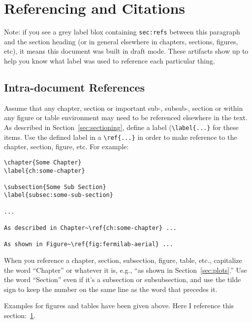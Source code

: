 \FloatBarrier
\section{Referencing and Citations}
\label{sec:refs}

Note: if you see a grey label blox containing \texttt{sec:refs}
between this paragraph and the section heading (or in general
elsewhere in chapters, sections, figures, etc), it means this document
was built in draft mode.  
These artifacts show up to help you know what label was used to
reference each particular thing.


\subsection{Intra-document References}

Assume that any chapter, section or important sub-, subsub-, section
or within any figure or table environment may need to be referenced
elsewhere in the text. As described in Section~\ref{sec:sectioning},
define a label (\verb|\label{...}| for these items.
Use the defined label in a \verb|\ref{...}| in order to make reference
to the chapter, section, figure, etc.
For example:

\begin{verbatim}
\chapter{Some Chapter}
\label{ch:some-chapter}

\subsection{Some Sub Section}
\label{subsec:some-sub-section}

...

As described in Chapter~\ref{ch:some-chapter} ...

As shown in Figure~\ref{fig:fermilab-aerial} ...
\end{verbatim}

When you reference a chapter, section, subsection, figure, table,
etc., capitalize the word ``Chapter'' or whatever it is, e.g., ``as
shown in Section~\ref{sec:plots}.''
Use the word ``Section'' even if it's a subsection or subsubsection,
and use the tilde sign to keep the number on the same line as the word
that precedes it.

Examples for figures and tables have been given above.  Here I
reference this section:~\ref{sec:refs}.  


